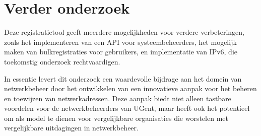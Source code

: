 \section{Verder onderzoek}
Deze registratietool geeft meerdere mogelijkheden voor verdere verbeteringen, zoals het implementeren van een API voor systeembeheerders, het mogelijk maken van bulkregistraties voor gebruikers, en implementatie van IPv6, die toekomstig onderzoek rechtvaardigen.

In essentie levert dit onderzoek een waardevolle bijdrage aan het domein van netwerkbeheer door het ontwikkelen van een innovatieve aanpak voor het beheren en toewijzen van netwerkadressen. Deze aanpak biedt niet alleen tastbare voordelen voor de netwerkbeheerders van UGent, maar heeft ook het potentieel om als model te dienen voor vergelijkbare organisaties die worstelen met vergelijkbare uitdagingen in netwerkbeheer.


